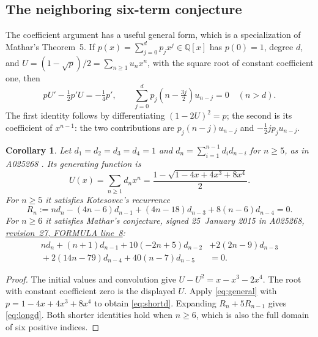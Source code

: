 \documentclass[11pt]{article}
\newtheorem{corollary}[theorem]{Corollary}
\newcommand{\Q}{\mathbb{Q}}
\begin{document}
\subsection{The neighboring six-term conjecture}

The coefficient argument has a useful general form, which is a
specialization of Mathar's Theorem~5. If
$p(x)=\sum_{j=0}^d p_jx^j\in\Q[x]$ has $p(0)=1$,
degree $d$, and $U=(1-\sqrt p)/2=\sum_{n\geq1}u_nx^n$, with the
square root of constant coefficient one, then
\begin{equation}\label{eq:general}
 pU'-\tfrac12p'U=-\tfrac14p',\qquad
 \sum_{j=0}^{d}p_j(n-\tfrac{3j}2)u_{n-j}=0\quad(n>d).
\end{equation}
The first identity follows by differentiating $(1-2U)^2=p$;
the second is its coefficient of $x^{n-1}$: the two contributions
are $p_j(n-j)u_{n-j}$ and $-\tfrac12jp_ju_{n-j}$.

\begin{corollary}\label{cor:neighbor}
Let $d_1=d_2=d_3=d_4=1$ and
$d_n=\sum_{i=1}^{n-1}d_i d_{n-i}$ for $n\geq5$, as in A025268
\cite{oeisd}. Its generating function is
\[
 U(x)=\sum_{n\geq1}d_nx^n
      =\frac{1-\sqrt{1-4x+4x^3+8x^4}}2.
\]
For $n\geq5$ it satisfies Kotesovec's recurrence
\begin{equation}\label{eq:shortd}
 R_n:=nd_n-(4n-6)d_{n-1}+(4n-18)d_{n-3}
                      +8(n-6)d_{n-4}=0.
\end{equation}
For $n\geq6$ it satisfies Mathar's conjecture, signed
25~January 2015 in A025268,
\href{https://raw.githubusercontent.com/oeis/oeisdata/57bbd254e161585873f56950ff19ba6dc4aeb66c/seq/A025/A025268.seq\#L8}
{revision~27, FORMULA line~8}:
\begin{equation}\label{eq:longd}
\begin{split}
 nd_n+(n+1)d_{n-1}+10(-2n+5)d_{n-2}
 &+2(2n-9)d_{n-3}\\
 {}+2(14n-79)d_{n-4}+40(n-7)d_{n-5}&=0.
\end{split}
\end{equation}
\end{corollary}
\begin{proof}
The initial values and convolution give $U-U^2=x-x^3-2x^4$.
The root with constant coefficient zero is the displayed $U$.
Apply \eqref{eq:general} with $p=1-4x+4x^3+8x^4$ to obtain
\eqref{eq:shortd}. Expanding $R_n+5R_{n-1}$ gives
\eqref{eq:longd}. Both shorter identities hold when $n\geq6$,
which is also the full domain of six positive indices.
\end{proof}
\end{document}
